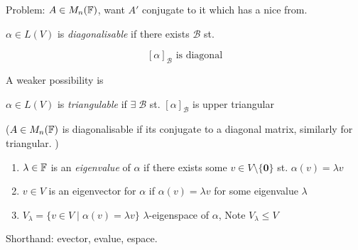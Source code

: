 \documentclass[a4paper]{article}
\begin{document}
Problem: $ A \in M_{n}(\mathbb{F}) $, want $ A' $ conjugate to it which has a nice from.


\begin{defi}
	$ \alpha \in L(V) $ is \emph{diagonalisable} if there exists $ \mathcal{B} $ st. 
	
	\[ [\alpha]_{\mathcal{B}} \text{ is diagonal} \]
	
\end{defi}

A weaker possibility is

\begin{defi}
	$ \alpha \in L(V) $ is \emph{triangulable} if $ \exists \; \mathcal{B} $ st. $ [\alpha]_{\mathcal{B}} $ is upper triangular
\end{defi}

($ A \in M_{n}(\mathbb{F}) $  is diagonalisable if its conjugate to a diagonal matrix, similarly for triangular.  )

\begin{defi}
\begin{enumerate}
	\item $ \lambda  \in \mathbb{F} $ is an \emph{eigenvalue} of $ \alpha $ if there exists some $ v  \in V \setminus \{ \mathbf{0} \} $ st. $ \alpha(v) = \lambda v $
	
	\item $ v \in V $ is an eigenvector for $ \alpha $ if $ \alpha(v) = \lambda v $ for some eigenvalue $ \lambda $
	
	\item $ V_{\lambda} = \{  v \in V \; | \; \alpha(v) = \lambda v \} $ $ \lambda $-eigenspace of $ \alpha $, Note $ V_{\lambda} \leq V $
	
\end{enumerate}
\end{defi}

Shorthand: evector, evalue, espace.
\end{document}
